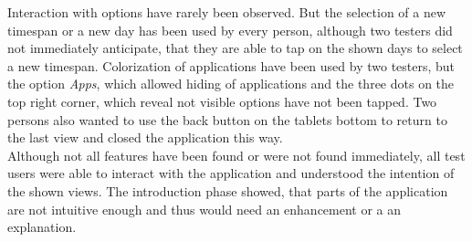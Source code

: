 Interaction  with options have rarely been observed. But the selection of a new timespan or a new day has been used by every person, although two testers did not immediately anticipate, that they are able to tap on the shown days to select a new timespan. Colorization of applications have been used by two testers, but the option \emph{Apps}, which allowed hiding of applications and the three dots on the top right corner, which reveal not visible options have not been tapped. Two persons also wanted to use the back button on the tablets bottom to return to the last view and closed the application this way.\\
Although not all features have been found or were not found immediately, all test users were able to interact with the application and understood the intention of the shown views. The introduction phase showed, that parts of the application are not intuitive enough and thus would need an enhancement or a an explanation.

